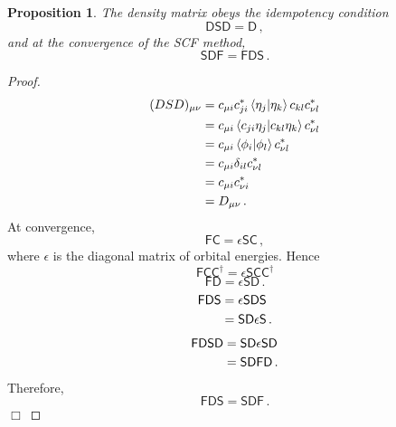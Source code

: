 \documentclass{article}
\theoremstyle{plain}\theoremheaderfont{\normalfont\itshape}\theorembodyfont{\rmfamily}\theoremseparator{.}\newtheorem*{rem}{Remark}\newtheorem*{ex}{Example}\newtheorem*{proof}{Proof}\newtheorem*{altp}{Alternative proof}
\theoremstyle{plain}\theoremheaderfont{\normalfont\bfseries}\theorembodyfont{\rmfamily}\theoremseparator{.}\newtheorem{thm}{Theorem}[section]\newtheorem{lem}[thm]{Lemma}\newtheorem{prop}[thm]{Proposition}\newtheorem*{cor}{Corollary}\newtheorem{defn}[thm]{Definition}\newtheorem{clm}[thm]{Claim}\newtheorem{clminproof}{Claim}
\theoremstyle{break}\theoremheaderfont{\normalfont\itshape}\theorembodyfont{\rmfamily}\theoremseparator{.\medskip}\newtheorem*{proofskip}{Proof}\newtheorem*{exs}{Examples}\newtheorem*{rems}{Remarks}
\theoremstyle{break}\theoremheaderfont{\normalfont\bfseries}\theorembodyfont{\rmfamily}\theoremseparator{.\medskip}\newtheorem{lemskip}[thm]{Lemma}\newtheorem{defnskip}[thm]{Definition}\newtheorem{propskip}[thm]{Proposition}\newtheorem{thmskip}[thm]{Theorem}
\numberwithin{equation}{section}
\newcommand{\qed}{\hfill\ensuremath{\Box}}
\newcommand{\braket}[2]{\left\langle #1 \middle| #2 \right\rangle}
\begin{document}
    \begin{prop}
        The density matrix obeys the \textit{idempotency condition}
        \begin{equation}
            \mathsf{DSD}=\mathsf{D}\,,
        \end{equation} 
        and at the convergence of the SCF method,
        \begin{equation}
            \mathsf{SDF}=\mathsf{FDS}\,.
        \end{equation}
    \end{prop}
    \begin{proof}
        \begin{align}
            (DSD)_{\mu\nu}&=c_{\mu i}c_{ji}^*\braket{\eta_j}{\eta_k}c_{kl}c_{\nu l}^*\notag\\
            &=c_{\mu i}\braket{c_{ji}\eta_j}{c_{kl}\eta_k}c_{\nu l}^*\notag\\
            &=c_{\mu i}\braket{\phi_i}{\phi_l}c_{\nu l}^*\notag\\
            &=c_{\mu i}\delta_{il}c_{\nu l}^*\notag\\
            &=c_{\mu i}c_{\nu i}^*\notag\\
            &=D_{\mu\nu}\,.
        \end{align}
        At convergence,
        \begin{equation}
            \mathsf{FC}=\mathsf{\epsilon SC}\,,
        \end{equation}
        where \(\mathsf{\epsilon}\) is the diagonal matrix of orbital energies. Hence
        \begin{equation}
            \mathsf{FCC^\dagger}=\mathsf{\epsilon SCC^\dagger}
        \end{equation}
        \begin{equation}
            \mathsf{FD}=\mathsf{\epsilon SD}\,.
        \end{equation}
        \begin{align}
            \mathsf{FDS}&=\mathsf{\epsilon SDS}\notag\\
            &=\mathsf{SD\epsilon S}\,.
        \end{align}
        \begin{align}
            \mathsf{FDSD}&=\mathsf{SD\epsilon SD}\notag\\
            &=\mathsf{SDFD}\,.
        \end{align}
        Therefore,
        \begin{equation}
            \mathsf{FDS}=\mathsf{SDF}\,.
        \end{equation}\qed
    \end{proof}
\end{document}
